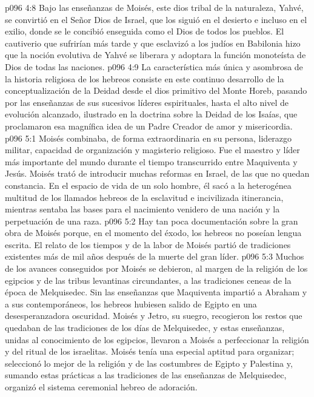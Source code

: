 \vs p096 4:8 Bajo las enseñanzas de Moisés, este dios tribal de la naturaleza, Yahvé, se convirtió en el Señor Dios de Israel, que los siguió en el desierto e incluso en el exilio, donde se le concibió enseguida como el Dios de todos los pueblos. El cautiverio que sufrirían más tarde y que esclavizó a los judíos en Babilonia hizo que la noción evolutiva de Yahvé se liberara y adoptara la función monoteísta de Dios de todas las naciones.
\vs p096 4:9 La característica más única y asombrosa de la historia religiosa de los hebreos consiste en este continuo desarrollo de la conceptualización de la Deidad desde el dios primitivo del Monte Horeb, pasando por las enseñanzas de sus sucesivos líderes espirituales, hasta el alto nivel de evolución alcanzado, ilustrado en la doctrina sobre la Deidad de los Isaías, que proclamaron esa magnífica idea de un Padre Creador de amor y misericordia.
\vs p096 5:1 Moisés combinaba, de forma extraordinaria en su persona, liderazgo militar, capacidad de organización y magisterio religioso. Fue el maestro y líder más importante del mundo durante el tiempo transcurrido entre Maquiventa y Jesús. Moisés trató de introducir muchas reformas en Israel, de las que no quedan constancia. En el espacio de vida de un solo hombre, él sacó a la heterogénea multitud de los llamados hebreos de la esclavitud e incivilizada itinerancia, mientras sentaba las bases para el nacimiento venidero de una nación y la perpetuación de una raza.
\vs p096 5:2 Hay tan poca documentación sobre la gran obra de Moisés porque, en el momento del éxodo, los hebreos no poseían lengua escrita. El relato de los tiempos y de la labor de Moisés partió de tradiciones existentes más de mil años después de la muerte del gran líder.
\vs p096 5:3 Muchos de los avances conseguidos por Moisés se debieron, al margen de la religión de los egipcios y de las tribus levantinas circundantes, a las tradiciones ceneas de la época de Melquisedec. Sin las enseñanzas que Maquiventa impartió a Abraham y a sus contemporáneos, los hebreos hubiesen salido de Egipto en una desesperanzadora oscuridad. Moisés y Jetro, su suegro, recogieron los restos que quedaban de las tradiciones de los días de Melquisedec, y estas enseñanzas, unidas al conocimiento de los egipcios, llevaron a Moisés a perfeccionar la religión y del ritual de los israelitas. Moisés tenía una especial aptitud para organizar; seleccionó lo mejor de la religión y de las costumbres de Egipto y Palestina y, sumando estas prácticas a las tradiciones de las enseñanzas de Melquisedec, organizó el sistema ceremonial hebreo de adoración.
